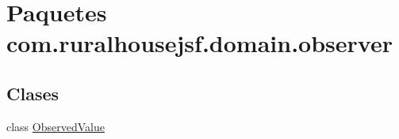 \hypertarget{a00116}{}\section{Paquetes com.\+ruralhousejsf.\+domain.\+observer}
\label{a00116}
\subsection*{Clases}
\begin{DoxyCompactItemize}
\item 
class \mbox{\hyperlink{a00180}{Observed\+Value}}
\end{DoxyCompactItemize}
